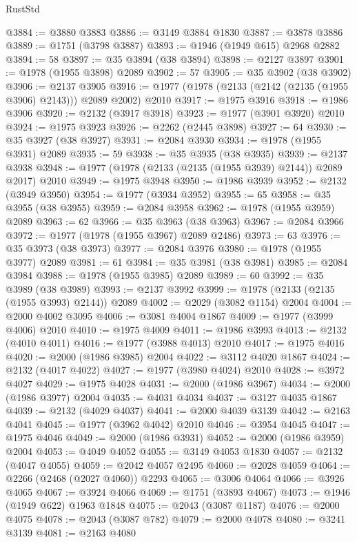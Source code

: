 \begin{lexlean}{RustStd}
\begin{coremodule}
@3884 := @3880 @3883
@3886 := @3149 @3884 @1830
@3887 := @3878 @3886
@3889 := @1751 (@3798 @3887)
@3893 := @1946 (@1949 @615) @2968 @2882
@3894 := 58
@3897 := @35 @3894 (@38 @3894)
@3898 := @2127 @3897
@3901 := @1978 (@1955 @3898) @2089
@3902 := 57
@3905 := @35 @3902 (@38 @3902)
@3906 := @2137 @3905
@3916 := @1977 (@1978 (@2133 (@2142 (@2135 (@1955 @3906) @2143))) @2089 @2002) @2010
@3917 := @1975 @3916
@3918 := @1986 @3906
@3920 := @2132 (@3917 @3918)
@3923 := @1977 (@3901 @3920) @2010
@3924 := @1975 @3923
@3926 := @2262 (@2445 @3898)
@3927 := 64
@3930 := @35 @3927 (@38 @3927)
@3931 := @2084 @3930
@3934 := @1978 (@1955 @3931) @2089
@3935 := 59
@3938 := @35 @3935 (@38 @3935)
@3939 := @2137 @3938
@3948 := @1977 (@1978 (@2133 (@2135 (@1955 @3939) @2144)) @2089 @2017) @2010
@3949 := @1975 @3948
@3950 := @1986 @3939
@3952 := @2132 (@3949 @3950)
@3954 := @1977 (@3934 @3952)
@3955 := 65
@3958 := @35 @3955 (@38 @3955)
@3959 := @2084 @3958
@3962 := @1978 (@1955 @3959) @2089
@3963 := 62
@3966 := @35 @3963 (@38 @3963)
@3967 := @2084 @3966
@3972 := @1977 (@1978 (@1955 @3967) @2089 @2486)
@3973 := 63
@3976 := @35 @3973 (@38 @3973)
@3977 := @2084 @3976
@3980 := @1978 (@1955 @3977) @2089
@3981 := 61
@3984 := @35 @3981 (@38 @3981)
@3985 := @2084 @3984
@3988 := @1978 (@1955 @3985) @2089
@3989 := 60
@3992 := @35 @3989 (@38 @3989)
@3993 := @2137 @3992
@3999 := @1978 (@2133 (@2135 (@1955 @3993) @2144)) @2089
@4002 := @2029 (@3082 @1154) @2004
@4004 := @2000 @4002 @3095
@4006 := @3081 @4004 @1867
@4009 := @1977 (@3999 @4006) @2010
@4010 := @1975 @4009
@4011 := @1986 @3993
@4013 := @2132 (@4010 @4011)
@4016 := @1977 (@3988 @4013) @2010
@4017 := @1975 @4016
@4020 := @2000 (@1986 @3985) @2004
@4022 := @3112 @4020 @1867
@4024 := @2132 (@4017 @4022)
@4027 := @1977 (@3980 @4024) @2010
@4028 := @3972 @4027
@4029 := @1975 @4028
@4031 := @2000 (@1986 @3967)
@4034 := @2000 (@1986 @3977) @2004
@4035 := @4031 @4034
@4037 := @3127 @4035 @1867
@4039 := @2132 (@4029 @4037)
@4041 := @2000 @4039 @3139
@4042 := @2163 @4041
@4045 := @1977 (@3962 @4042) @2010
@4046 := @3954 @4045
@4047 := @1975 @4046
@4049 := @2000 (@1986 @3931)
@4052 := @2000 (@1986 @3959) @2004
@4053 := @4049 @4052
@4055 := @3149 @4053 @1830
@4057 := @2132 (@4047 @4055)
@4059 := @2042 @4057 @2495
@4060 := @2028 @4059
@4064 := @2266 (@2468 (@2027 @4060)) @2293
@4065 := @3006 @4064
@4066 := @3926 @4065
@4067 := @3924 @4066
@4069 := @1751 (@3893 @4067)
@4073 := @1946 (@1949 @622) @1963 @1848
@4075 := @2043 (@3087 @1187)
@4076 := @2000 @4075
@4078 := @2043 (@3087 @782)
@4079 := @2000 @4078
@4080 := @3241 @3139
@4081 := @2163 @4080

\end{coremodule}
\end{lexlean}
